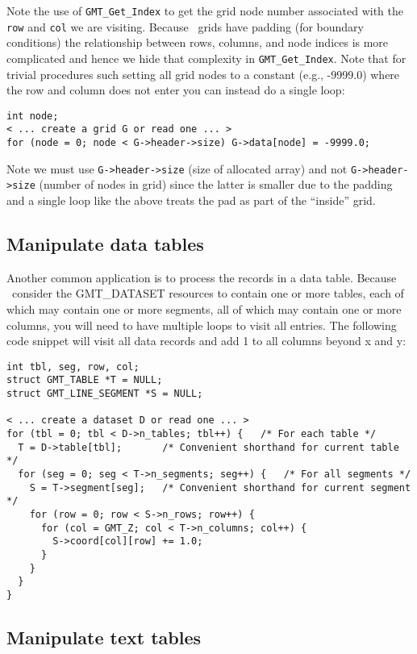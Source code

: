 \documentclass[11pt]{report}
\begin{document}
Note the use of \texttt{GMT\_Get\_Index} to get the grid node number associated
with the \texttt{row} and \texttt{col} we are visiting.  Because \GMT\ grids have
padding (for boundary conditions) the relationship between rows, columns, and
node indices is more complicated and hence we hide that complexity in \texttt{GMT\_Get\_Index}.
Note that for trivial procedures such setting all grid nodes to a constant (e.g., -9999.0)
where the row and column does not enter you can instead do a single loop:

\begin{verbatim}
int node;
< ... create a grid G or read one ... >
for (node = 0; node < G->header->size) G->data[node] = -9999.0;
\end{verbatim}

Note we must use \texttt{G->header->size} (size of allocated array) and not
\texttt{G->header->size} (number of nodes in grid) since the latter is smaller
due to the padding and a single loop like the above treats the pad as part of
the ``inside'' grid.

\subsection{Manipulate data tables}

Another common application is to process the records in a data table.
Because \GMT\ consider the GMT\_DATASET resources to contain one or
more tables, each of which may contain one or more segments, all of
which may contain one or more columns, you will need to have multiple
loops to visit all entries.  The following code snippet will visit
all data records and add 1 to all columns beyond x and y:

\begin{verbatim}
int tbl, seg, row, col;
struct GMT_TABLE *T = NULL;
struct GMT_LINE_SEGMENT *S = NULL;

< ... create a dataset D or read one ... >
for (tbl = 0; tbl < D->n_tables; tbl++) {	/* For each table */
  T = D->table[tbl];       /* Convenient shorthand for current table */
  for (seg = 0; seg < T->n_segments; seg++) {	/* For all segments */
    S = T->segment[seg];   /* Convenient shorthand for current segment */
    for (row = 0; row < S->n_rows; row++) {
      for (col = GMT_Z; col < T->n_columns; col++) {
        S->coord[col][row] += 1.0;
      }
    }
  }
}
\end{verbatim}

\subsection{Manipulate text tables}
\end{document}
